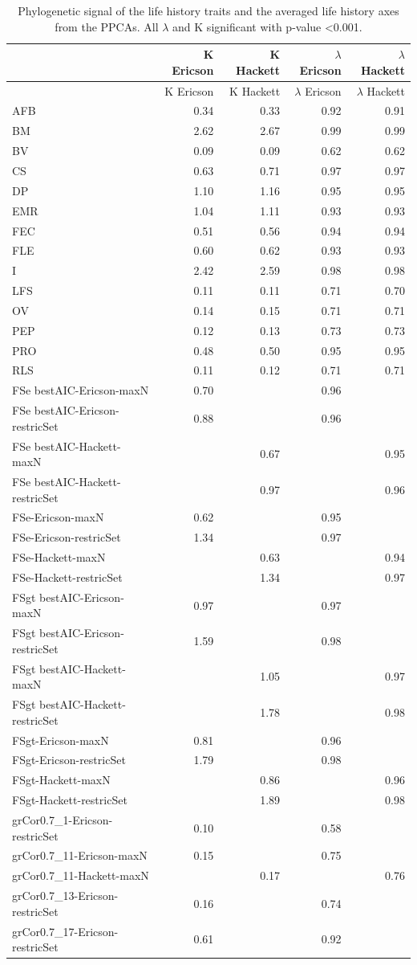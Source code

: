 \clearpage%
\begin{footnotesize}
\begin{longtable}{@{}lrrrr@{}}
\caption[Phylogenetic signal]{
Phylogenetic signal of the life history traits and the averaged life history
axes from the PPCAs. All $\lambda$ and K significant with p-value
\textless{0.001}.}
\label{tab:tabApp2.1.7}\\
\toprule
  & K Ericson & K Hackett & $\lambda$ Ericson & $\lambda$ Hackett\tabularnewline
\midrule
\endfirsthead
\toprule
  & K Ericson & K Hackett & $\lambda$ Ericson & $\lambda$ Hackett\tabularnewline
\midrule
\endhead
AFB & 0.34 & 0.33 & 0.92 & 0.91\tabularnewline
BM & 2.62 & 2.67 & 0.99 & 0.99\tabularnewline
BV & 0.09 & 0.09 & 0.62 & 0.62\tabularnewline
CS & 0.63 & 0.71 & 0.97 & 0.97\tabularnewline
DP & 1.10 & 1.16 & 0.95 & 0.95\tabularnewline
EMR & 1.04 & 1.11 & 0.93 & 0.93\tabularnewline
FEC & 0.51 & 0.56 & 0.94 & 0.94\tabularnewline
FLE & 0.60 & 0.62 & 0.93 & 0.93\tabularnewline
I & 2.42 & 2.59 & 0.98 & 0.98\tabularnewline
LFS & 0.11 & 0.11 & 0.71 & 0.70\tabularnewline
OV & 0.14 & 0.15 & 0.71 & 0.71\tabularnewline
PEP & 0.12 & 0.13 & 0.73 & 0.73\tabularnewline
PRO & 0.48 & 0.50 & 0.95 & 0.95\tabularnewline
RLS & 0.11 & 0.12 & 0.71 & 0.71\tabularnewline
FSe bestAIC-Ericson-maxN & 0.70 &  & 0.96 & \tabularnewline
FSe bestAIC-Ericson-restricSet & 0.88 &  & 0.96 & \tabularnewline
FSe bestAIC-Hackett-maxN &  & 0.67 &  & 0.95\tabularnewline
FSe bestAIC-Hackett-restricSet &  & 0.97 &  & 0.96\tabularnewline
FSe-Ericson-maxN & 0.62 &  & 0.95 & \tabularnewline
FSe-Ericson-restricSet & 1.34 &  & 0.97 & \tabularnewline
FSe-Hackett-maxN &  & 0.63 &  & 0.94\tabularnewline
FSe-Hackett-restricSet &  & 1.34 &  & 0.97\tabularnewline
FSgt bestAIC-Ericson-maxN & 0.97 &  & 0.97 & \tabularnewline
FSgt bestAIC-Ericson-restricSet & 1.59 &  & 0.98 & \tabularnewline
FSgt bestAIC-Hackett-maxN &  & 1.05 &  & 0.97\tabularnewline
FSgt bestAIC-Hackett-restricSet &  & 1.78 &  & 0.98\tabularnewline
FSgt-Ericson-maxN & 0.81 &  & 0.96 & \tabularnewline
FSgt-Ericson-restricSet & 1.79 &  & 0.98 & \tabularnewline
FSgt-Hackett-maxN &  & 0.86 &  & 0.96\tabularnewline
FSgt-Hackett-restricSet &  & 1.89 &  & 0.98\tabularnewline
grCor0.7\_1-Ericson-restricSet & 0.10 &  & 0.58 & \tabularnewline
grCor0.7\_11-Ericson-maxN & 0.15 &  & 0.75 & \tabularnewline
grCor0.7\_11-Hackett-maxN &  & 0.17 &  & 0.76\tabularnewline
grCor0.7\_13-Ericson-restricSet & 0.16 &  & 0.74 & \tabularnewline
grCor0.7\_17-Ericson-restricSet & 0.61 &  & 0.92 & \tabularnewline

\end{longtable}
\end{footnotesize}
